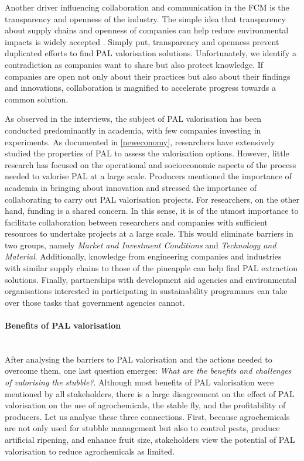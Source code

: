 Another driver influencing collaboration and communication in the FCM is the transparency and openness of the industry. The simple idea that transparency about supply chains and openness of companies can help reduce environmental impacts is widely accepted \citep{kashmanian2017building, jahansoozi2006organization}. Simply put, transparency and openness prevent duplicated efforts to find PAL valorisation solutions. Unfortunately, we identify a contradiction as companies want to share but also protect knowledge. If companies are open not only about their practices but also about their findings and innovations, collaboration is magnified to accelerate progress towards a common solution.

As observed in the interviews, the subject of PAL valorisation has been conducted predominantly in academia, with few companies investing in experiments. As documented in \cref{neweconomy}, researchers have extensively studied the properties of PAL to assess the valorisation options. However, little research has focused on the operational and socioeconomic aspects of the process needed to valorise PAL at a large scale. Producers mentioned the importance of academia in bringing about innovation and stressed the importance of collaborating to carry out PAL valorisation projects. For researchers, on the other hand, funding is a shared concern. In this sense, it is of the utmost importance to facilitate collaboration between researchers and companies with sufficient resources to undertake projects at a large scale. This would eliminate barriers in two groups, namely \textit{Market and Investment Conditions} and \textit{Technology and Material}. Additionally, knowledge from engineering companies and industries with similar supply chains to those of the pineapple can help find PAL extraction solutions. Finally, partnerships with development aid agencies and environmental organisations interested in participating in sustainability programmes can take over those tasks that government agencies cannot.

\paragraph{Benefits of PAL valorisation} \mbox{}\\
After analysing the barriers to PAL valorisation and the actions needed to overcome them, one last question emerges: \textit{What are the benefits and challenges of valorising the stubble?}. Although most benefits of PAL valorisation were mentioned by all stakeholders, there is a large disagreement on the effect of PAL valorisation on the use of agrochemicals, the stable fly, and the profitability of producers. Let us analyse these three connections. First, because agrochemicals are not only used for stubble management but also to control pests, produce artificial ripening, and enhance fruit size, stakeholders view the potential of PAL valorisation to reduce agrochemicals as limited. 

